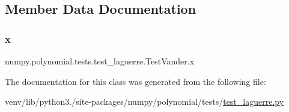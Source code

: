 \subsection{Member Data Documentation}
\mbox{\label{classnumpy_1_1polynomial_1_1tests_1_1test__laguerre_1_1TestVander_a74f698bbff77c6395964f6b1aa8bb70b}} 
\subsubsection{\texorpdfstring{x}{x}}
{\footnotesize\ttfamily numpy.\+polynomial.\+tests.\+test\+\_\+laguerre.\+Test\+Vander.\+x\hspace{0.3cm}{\ttfamily [static]}}



The documentation for this class was generated from the following file\+:\begin{DoxyCompactItemize}
\item 
venv/lib/python3./site-\/packages/numpy/polynomial/tests/\hyperlink{test__laguerre_8py}{test\+\_\+laguerre.\+py}\end{DoxyCompactItemize}
